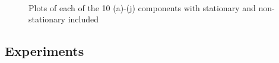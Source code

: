 \documentclass[a4paper, 12pt, titlepage]{article}
\begin{document}
\begin{figure}[H]
	 \\
	\caption{ Plots of each of the 10  (a)-(j) components with stationary and non-stationary included }
\end{figure}


\subsection{Experiments}
\end{document}
